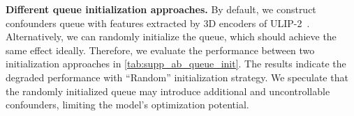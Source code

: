 \vspace{0.1cm}
\noindent
{\bf Different queue initialization approaches.} By default, we construct confounders queue with features extracted by 3D encoders of ULIP-2~\cite{xue2024ulip}. Alternatively, we can randomly initialize the queue, which should achieve the same effect ideally. Therefore, we evaluate the performance between two initialization approaches in \cref{tab:supp_ab_queue_init}. The results indicate the degraded performance with “Random” initialization strategy. We speculate that the randomly initialized queue may introduce additional and uncontrollable confounders, limiting the model's optimization potential.



